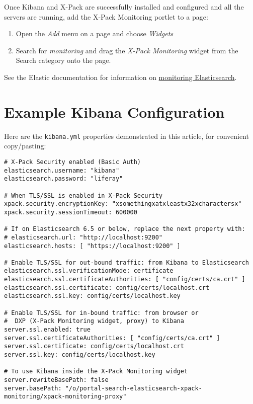 Once Kibana and X-Pack are successfully installed and configured and all
the servers are running, add the X-Pack Monitoring portlet to a page:

\begin{enumerate}
\def\labelenumi{\arabic{enumi}.}
\item
  Open the \emph{Add} menu on a page and choose \emph{Widgets}
\item
  Search for \emph{monitoring} and drag the \emph{X-Pack Monitoring}
  widget from the Search category onto the page.
\end{enumerate}

See the Elastic documentation for information on
\href{https://www.elastic.co/guide/en/elasticsearch/reference/7.x/es-monitoring.html}{monitoring
Elasticsearch}.

\section{Example Kibana
Configuration}\label{example-kibana-configuration}

Here are the \texttt{kibana.yml} properties demonstrated in this
article, for convenient copy/pasting:

\begin{verbatim}
# X-Pack Security enabled (Basic Auth)
elasticsearch.username: "kibana"
elasticsearch.password: "liferay"

# When TLS/SSL is enabled in X-Pack Security
xpack.security.encryptionKey: "xsomethingxatxleastx32xcharactersx"
xpack.security.sessionTimeout: 600000

# If on Elasticsearch 6.5 or below, replace the next property with:
# elasticsearch.url: "http://localhost:9200"
elasticsearch.hosts: [ "https://localhost:9200" ]

# Enable TLS/SSL for out-bound traffic: from Kibana to Elasticsearch
elasticsearch.ssl.verificationMode: certificate
elasticsearch.ssl.certificateAuthorities: [ "config/certs/ca.crt" ]
elasticsearch.ssl.certificate: config/certs/localhost.crt
elasticsearch.ssl.key: config/certs/localhost.key

# Enable TLS/SSL for in-bound traffic: from browser or
#  DXP (X-Pack Monitoring widget, proxy) to Kibana
server.ssl.enabled: true
server.ssl.certificateAuthorities: [ "config/certs/ca.crt" ]
server.ssl.certificate: config/certs/localhost.crt
server.ssl.key: config/certs/localhost.key

# To use Kibana inside the X-Pack Monitoring widget
server.rewriteBasePath: false
server.basePath: "/o/portal-search-elasticsearch-xpack-monitoring/xpack-monitoring-proxy"
\end{verbatim}

